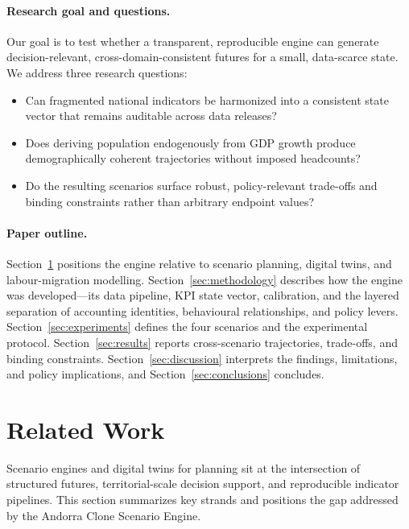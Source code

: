 \documentclass[urbansci,article,submit,pdftex,moreauthors]{Definitions/mdpi}
\begin{document}
\paragraph{Research goal and questions.}
Our goal is to test whether a transparent, reproducible engine can generate
decision-relevant, cross-domain-consistent futures for a small, data-scarce state.
We address three research questions:
\begin{itemize}
\item[\textbf{RQ1}] Can fragmented national indicators be harmonized into a
      consistent state vector that remains auditable across data releases?
\item[\textbf{RQ2}] Does deriving population endogenously from GDP growth produce
      demographically coherent trajectories without imposed headcounts?
\item[\textbf{RQ3}] Do the resulting scenarios surface robust, policy-relevant
      trade-offs and binding constraints rather than arbitrary endpoint values?
\end{itemize}

\paragraph{Paper outline.}
Section~\ref{sec:related_work} positions the engine relative to scenario planning,
digital twins, and labour-migration modelling. Section~\ref{sec:methodology}
describes how the engine was developed---its data pipeline, KPI state vector,
calibration, and the layered separation of accounting identities, behavioural
relationships, and policy levers. Section~\ref{sec:experiments} defines the four
scenarios and the experimental protocol. Section~\ref{sec:results} reports
cross-scenario trajectories, trade-offs, and binding constraints.
Section~\ref{sec:discussion} interprets the findings, limitations, and policy
implications, and Section~\ref{sec:conclusions} concludes.

\section{Related Work}
\label{sec:related_work}

Scenario engines and digital twins for planning sit at the intersection of
structured futures, territorial-scale decision support, and reproducible
indicator pipelines. This section summarizes key strands and positions the gap
addressed by the Andorra Clone Scenario Engine.
\end{document}
